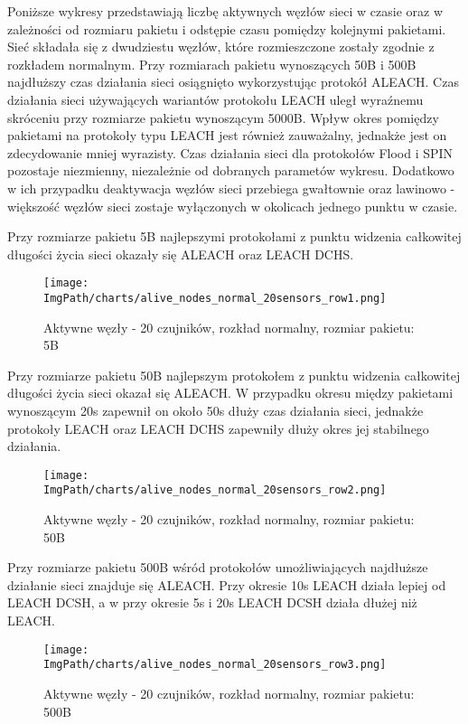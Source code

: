 Poniższe wykresy przedstawiają liczbę aktywnych węzłów sieci w czasie oraz w zależności od rozmiaru pakietu i odstępie czasu pomiędzy kolejnymi pakietami. Sieć składała się z dwudziestu węzłów, które rozmieszczone zostały zgodnie z rozkładem normalnym.
Przy rozmiarach pakietu wynoszących 50B i 500B najdłuższy czas działania sieci osiągnięto wykorzystując protokół ALEACH. Czas działania sieci używających wariantów protokołu LEACH uległ wyraźnemu skróceniu przy rozmiarze pakietu wynoszącym 5000B. Wpływ okres pomiędzy pakietami na protokoły typu LEACH jest również zauważalny, jednakże jest on zdecydowanie mniej wyrazisty. Czas działania sieci dla protokołów Flood i SPIN pozostaje niezmienny, niezależnie od dobranych parametów wykresu. Dodatkowo w ich przypadku deaktywacja węzłów sieci przebiega gwałtownie oraz lawinowo - większość węzłów sieci zostaje wyłączonych w okolicach jednego punktu w czasie.

Przy rozmiarze pakietu 5B najlepszymi protokołami z punktu widzenia całkowitej długości życia sieci okazały się ALEACH oraz LEACH DCHS.

\begin{figure}[H]
	\begin{center}
		\texttt{[image: \\ImgPath/charts/alive\_nodes\_normal\_20sensors\_row1.png]}
	\end{center}
	\caption{Aktywne węzły - 20 czujników, rozkład normalny, rozmiar pakietu: 5B}
\end{figure}

Przy rozmiarze pakietu 50B najlepszym protokołem z punktu widzenia całkowitej długości życia sieci okazał się ALEACH. W przypadku okresu między pakietami wynoszącym 20s zapewnił on około 50s dłuży czas działania sieci, jednakże protokoły LEACH oraz LEACH DCHS zapewniły dłuży okres jej stabilnego działania.

\begin{figure}[H]
	\begin{center}
		\texttt{[image: \\ImgPath/charts/alive\_nodes\_normal\_20sensors\_row2.png]}
	\end{center}
	\caption{Aktywne węzły - 20 czujników, rozkład normalny, rozmiar pakietu: 50B}
\end{figure}

Przy rozmiarze pakietu 500B wśród protokołów umożliwiających najdłuższe działanie sieci znajduje się ALEACH. Przy okresie 10s LEACH działa lepiej od LEACH DCSH, a w przy okresie 5s i 20s LEACH DCSH działa dłużej niż LEACH.

\begin{figure}[H]
	\begin{center}
		\texttt{[image: \\ImgPath/charts/alive\_nodes\_normal\_20sensors\_row3.png]}
	\end{center}
	\caption{Aktywne węzły - 20 czujników, rozkład normalny, rozmiar pakietu: 500B}
\end{figure}

